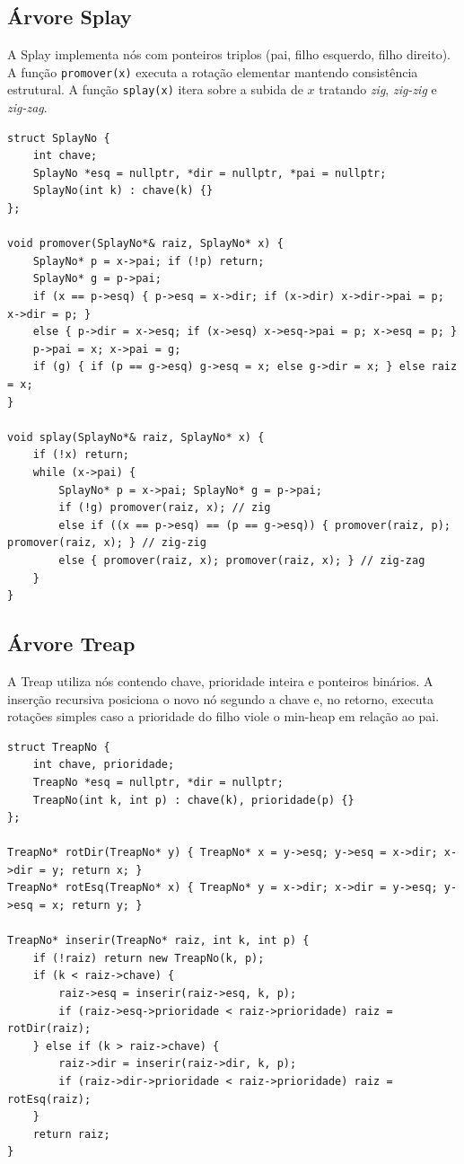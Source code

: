 \documentclass[11pt,a4paper]{article}
\begin{document}
\subsection{Árvore Splay}
A Splay implementa nós com ponteiros triplos (pai, filho esquerdo, filho direito). A função \texttt{promover(x)} executa a rotação elementar mantendo consistência estrutural. A função \texttt{splay(x)} itera sobre a subida de $x$ tratando \textit{zig}, \textit{zig-zig} e \textit{zig-zag}.

\begin{lstlisting}[caption={Rotina de autoajuste hierárquico na Árvore Splay.},label={alg:splay}]
struct SplayNo {
    int chave;
    SplayNo *esq = nullptr, *dir = nullptr, *pai = nullptr;
    SplayNo(int k) : chave(k) {}
};

void promover(SplayNo*& raiz, SplayNo* x) {
    SplayNo* p = x->pai; if (!p) return;
    SplayNo* g = p->pai;
    if (x == p->esq) { p->esq = x->dir; if (x->dir) x->dir->pai = p; x->dir = p; }
    else { p->dir = x->esq; if (x->esq) x->esq->pai = p; x->esq = p; }
    p->pai = x; x->pai = g;
    if (g) { if (p == g->esq) g->esq = x; else g->dir = x; } else raiz = x;
}

void splay(SplayNo*& raiz, SplayNo* x) {
    if (!x) return;
    while (x->pai) {
        SplayNo* p = x->pai; SplayNo* g = p->pai;
        if (!g) promover(raiz, x); // zig
        else if ((x == p->esq) == (p == g->esq)) { promover(raiz, p); promover(raiz, x); } // zig-zig
        else { promover(raiz, x); promover(raiz, x); } // zig-zag
    }
}
\end{lstlisting}

\subsection{Árvore Treap}
A Treap utiliza nós contendo chave, prioridade inteira e ponteiros binários. A inserção recursiva posiciona o novo nó segundo a chave e, no retorno, executa rotações simples caso a prioridade do filho viole o min-heap em relação ao pai.

\begin{lstlisting}[caption={Inserção recursiva e rotações na Árvore Treap.},label={alg:treap}]
struct TreapNo {
    int chave, prioridade;
    TreapNo *esq = nullptr, *dir = nullptr;
    TreapNo(int k, int p) : chave(k), prioridade(p) {}
};

TreapNo* rotDir(TreapNo* y) { TreapNo* x = y->esq; y->esq = x->dir; x->dir = y; return x; }
TreapNo* rotEsq(TreapNo* x) { TreapNo* y = x->dir; x->dir = y->esq; y->esq = x; return y; }

TreapNo* inserir(TreapNo* raiz, int k, int p) {
    if (!raiz) return new TreapNo(k, p);
    if (k < raiz->chave) {
        raiz->esq = inserir(raiz->esq, k, p);
        if (raiz->esq->prioridade < raiz->prioridade) raiz = rotDir(raiz);
    } else if (k > raiz->chave) {
        raiz->dir = inserir(raiz->dir, k, p);
        if (raiz->dir->prioridade < raiz->prioridade) raiz = rotEsq(raiz);
    }
    return raiz;
}
\end{lstlisting}
\end{document}
